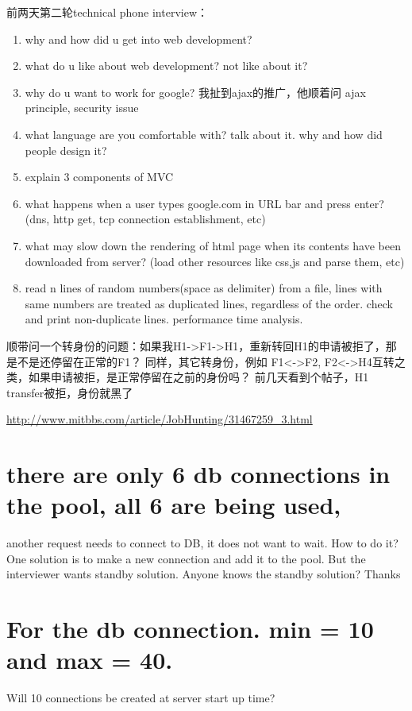 \documentclass[12pt]{book}
\begin{document}
前两天第二轮technical phone interview：

\begin{enumerate}
\item why and how did u get into web development?
\item what do u like about web development? not like about it?
\item why do u want to work for google? 我扯到ajax的推广，他顺着问 ajax principle, security issue
\item what language are you comfortable with? talk about it. why and how did people design it?
\item explain 3 components of MVC
\item what happens when a user types google.com in URL bar and press enter?(dns, http get, tcp connection establishment, etc)
\item what may slow down the rendering of html page when its contents have been downloaded from server? (load other resources like css,js and parse them, etc)
\item read n lines of random numbers(space as delimiter) from a file, lines with same numbers are treated as duplicated lines, regardless of the order. check and print non-duplicate lines. performance time analysis.
\end{enumerate}

顺带问一个转身份的问题：如果我H1->F1->H1，重新转回H1的申请被拒了，那是不是还停留在正常的F1？ 同样，其它转身份，例如 F1<->F2, F2<->H4互转之类，如果申请被拒，是正常停留在之前的身份吗？ 前几天看到个帖子，H1 transfer被拒，身份就黑了

\url{http://www.mitbbs.com/article/JobHunting/31467259_3.html}

\section{there are only 6 db connections in the pool, all 6 are being used,}
\label{sec-13-25}
another request needs to connect to DB, it does not want to wait. How to do 
it? One solution is to make a new connection and add it to the pool. But the
interviewer wants standby solution. Anyone knows the standby solution? 
Thanks

\section{For the db connection. min = 10 and max = 40.}
\label{sec-13-26}
Will 10 connections be created at server start up time?
\end{document}
